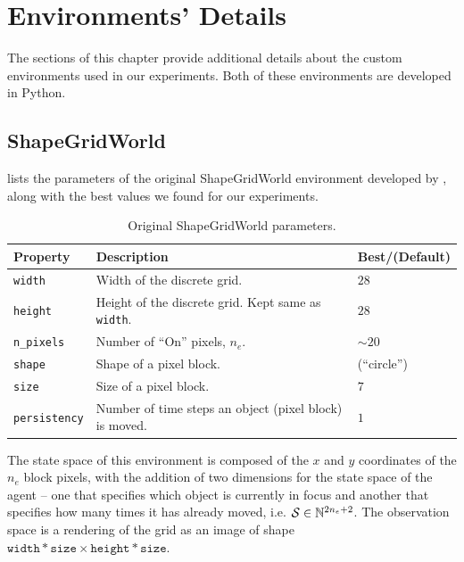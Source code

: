 \makeatletter
{}
\makeatother
{}

\chapter{Environments' Details}
\label{sec:environments-details}
The sections of this chapter provide additional details about the custom environments used in our experiments.
Both of these environments are developed in Python.

\section{ShapeGridWorld}
\label{sec:sgw-details}
 lists the parameters of the original ShapeGridWorld environment developed by \cite{rair}, along with the best values we found for our experiments.
\begin{table}[H]
    \centering
    \caption{Original ShapeGridWorld parameters.}
    \begin{tabularx}{\textwidth}{C{3.9cm} L C{2cm}}
        \hline
        Property & Description & Best/(Default)\\
        \hline
        \texttt{width} & Width of the discrete grid. & \(28\)\\
        \texttt{height} & Height of the discrete grid. Kept same as \texttt{width}. & \(28\)\\
        \texttt{n\_pixels} & Number of ``On'' pixels, \(n_e\). & \(\sim 20\)\\
        \texttt{shape} & Shape of a pixel block. & (``circle'')\\
        \texttt{size} & Size of a pixel block. & \(7\)\\
        \texttt{persistency} & Number of time steps an object (pixel block) is moved. & \(1\)\\
        \hline
    \end{tabularx}
    \label{tab:original-sgw-params}
\end{table}
The state space of this environment is composed of the \(x\) and \(y\) coordinates of the \(n_e\) block pixels, with the addition of two dimensions for the state space of the agent -- one that specifies which object is currently in focus and another that specifies how many times it has already moved, i.e. \(\mathcal{S} \in \mathbb{N}^{2 n_e + 2}\).
The observation space is a rendering of the grid as an image of shape \(\texttt{width} * \texttt{size} \times \texttt{height} * \texttt{size}\).

